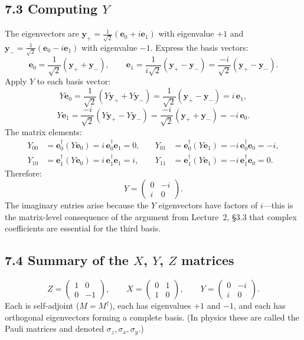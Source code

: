 \documentclass[12pt,a4paper]{article}
\begin{document}
\subsection{7.3 Computing $Y$}
The eigenvectors are $\mathbf{y}_+=\frac{1}{\sqrt{2}}(\mathbf{e}_0+i\mathbf{e}_1)$ with eigenvalue $+1$ and $\mathbf{y}_-=\frac{1}{\sqrt{2}}(\mathbf{e}_0-i\mathbf{e}_1)$ with eigenvalue $-1$.  Express the basis vectors:
\[
    \mathbf{e}_0 = \frac{1}{\sqrt{2}}(\mathbf{y}_++\mathbf{y}_-), \qquad
    \mathbf{e}_1 = \frac{1}{i\sqrt{2}}(\mathbf{y}_+-\mathbf{y}_-) = \frac{-i}{\sqrt{2}}(\mathbf{y}_+-\mathbf{y}_-).
\]
Apply $Y$ to each basis vector:
\[
    Y\mathbf{e}_0 = \frac{1}{\sqrt{2}}(Y\mathbf{y}_++Y\mathbf{y}_-) = \frac{1}{\sqrt{2}}(\mathbf{y}_+-\mathbf{y}_-) = i\,\mathbf{e}_1,
\]
\[
    Y\mathbf{e}_1 = \frac{-i}{\sqrt{2}}(Y\mathbf{y}_+-Y\mathbf{y}_-) = \frac{-i}{\sqrt{2}}(\mathbf{y}_++\mathbf{y}_-) = -i\,\mathbf{e}_0.
\]
The matrix elements:
\begin{align}
    Y_{00} &= \mathbf{e}_0^\dagger(Y\mathbf{e}_0) = i\,\mathbf{e}_0^\dagger\mathbf{e}_1 = 0, &\quad
    Y_{01} &= \mathbf{e}_0^\dagger(Y\mathbf{e}_1) = -i\,\mathbf{e}_0^\dagger\mathbf{e}_0 = -i, \\[4pt]
    Y_{10} &= \mathbf{e}_1^\dagger(Y\mathbf{e}_0) = i\,\mathbf{e}_1^\dagger\mathbf{e}_1 = i, &\quad
    Y_{11} &= \mathbf{e}_1^\dagger(Y\mathbf{e}_1) = -i\,\mathbf{e}_1^\dagger\mathbf{e}_0 = 0.
\end{align}
Therefore:
\[
    Y = \begin{pmatrix}0&-i\\i&0\end{pmatrix}.
\]
The imaginary entries arise because the $Y$ eigenvectors have factors of $i$---this is the matrix-level consequence of the argument from Lecture~2, \S3.3 that complex coefficients are essential for the third basis.

\subsection{7.4 Summary of the $X$, $Y$, $Z$ matrices}
\[
    \boxed{Z = \begin{pmatrix}1&0\\0&-1\end{pmatrix}, \qquad
    X = \begin{pmatrix}0&1\\1&0\end{pmatrix}, \qquad
    Y = \begin{pmatrix}0&-i\\i&0\end{pmatrix}.}
\]
Each is self-adjoint ($M = M^\dagger$), each has eigenvalues $+1$ and $-1$, and each has orthogonal eigenvectors forming a complete basis.  (In physics these are called the Pauli matrices and denoted $\sigma_z, \sigma_x, \sigma_y$.)
\end{document}
